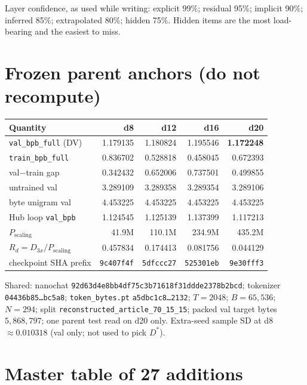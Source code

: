 \documentclass[11pt,a4paper]{article}
\begin{document}
Layer confidence, as used while writing: explicit 99\%; residual 95\%; implicit 90\%; inferred 85\%; extrapolated 80\%; hidden 75\%. Hidden items are the most load-bearing and the easiest to miss.

\section{Frozen parent anchors (do not recompute)}
\label{sec:anchors}

\begin{center}
\small
\begin{tabular}{lrrrr}
\toprule
Quantity & d8 & d12 & d16 & d20 \\
\midrule
\texttt{val\_bpb\_full} (DV) & 1.179135 & 1.180824 & 1.195546 & \textbf{1.172248} \\
\texttt{train\_bpb\_full} & 0.836702 & 0.528818 & 0.458045 & 0.672393 \\
val$-$train gap & 0.342432 & 0.652006 & 0.737501 & 0.499855 \\
untrained val & 3.289109 & 3.289358 & 3.289354 & 3.289106 \\
byte unigram val & 4.453225 & 4.453225 & 4.453225 & 4.453225 \\
Hub loop \texttt{val\_bpb} & 1.124545 & 1.125139 & 1.137399 & 1.117213 \\
$P_{\mathrm{scaling}}$ & 41.9M & 110.1M & 234.9M & 435.2M \\
$R_d=D_{3x}/P_{\mathrm{scaling}}$ & 0.457834 & 0.174413 & 0.081756 & 0.044129 \\
checkpoint SHA prefix & \texttt{9c407f4f} & \texttt{5dfccc27} & \texttt{525301eb} & \texttt{9e30fff3} \\
\bottomrule
\end{tabular}
\end{center}

Shared: nanochat \texttt{92d63d4e8bb4df75c3b71618f31ddde2378b2bcd}; tokenizer \texttt{04436b85\ldots bc5a8}; \texttt{token\_bytes.pt} \texttt{a5dbc1c8\ldots 2132}; $T=2048$; $B=65{,}536$; $N=294$; split \texttt{reconstructed\_article\_70\_15\_15}; packed val target bytes $5{,}868{,}797$; one parent test read on d20 only. Extra-seed sample SD at d8 $\approx 0.010318$ (val only; not used to pick $D^{\ast}$).

\section{Master table of 27 additions}
\label{sec:master}
\end{document}
